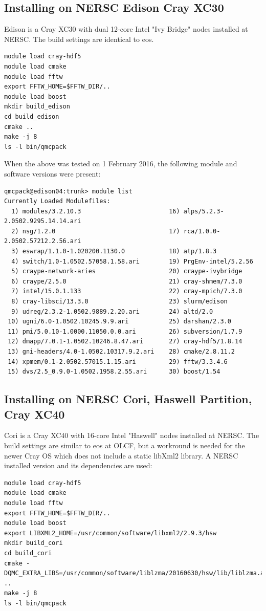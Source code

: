 \subsection{Installing on NERSC Edison Cray XC30}

Edison is a Cray XC30 with dual 12-core Intel "Ivy Bridge" nodes
installed at NERSC. The build settings are identical to eos.

\begin{verbatim}
module load cray-hdf5
module load cmake
module load fftw
export FFTW_HOME=$FFTW_DIR/..
module load boost
mkdir build_edison
cd build_edison
cmake ..
make -j 8
ls -l bin/qmcpack
\end{verbatim}
When the above was tested on 1 February 2016, the following module and
software versions were present:
\begin{verbatim}
qmcpack@edison04:trunk> module list
Currently Loaded Modulefiles:
  1) modules/3.2.10.3                        16) alps/5.2.3-2.0502.9295.14.14.ari
  2) nsg/1.2.0                               17) rca/1.0.0-2.0502.57212.2.56.ari
  3) eswrap/1.1.0-1.020200.1130.0            18) atp/1.8.3
  4) switch/1.0-1.0502.57058.1.58.ari        19) PrgEnv-intel/5.2.56
  5) craype-network-aries                    20) craype-ivybridge
  6) craype/2.5.0                            21) cray-shmem/7.3.0
  7) intel/15.0.1.133                        22) cray-mpich/7.3.0
  8) cray-libsci/13.3.0                      23) slurm/edison
  9) udreg/2.3.2-1.0502.9889.2.20.ari        24) altd/2.0
 10) ugni/6.0-1.0502.10245.9.9.ari           25) darshan/2.3.0
 11) pmi/5.0.10-1.0000.11050.0.0.ari         26) subversion/1.7.9
 12) dmapp/7.0.1-1.0502.10246.8.47.ari       27) cray-hdf5/1.8.14
 13) gni-headers/4.0-1.0502.10317.9.2.ari    28) cmake/2.8.11.2
 14) xpmem/0.1-2.0502.57015.1.15.ari         29) fftw/3.3.4.6
 15) dvs/2.5_0.9.0-1.0502.1958.2.55.ari      30) boost/1.54
\end{verbatim}

\subsection{Installing on NERSC Cori, Haswell Partition, Cray XC40}
Cori is a Cray XC40 with 16-core Intel "Haswell" nodes
installed at NERSC. The build settings are similar to eos at OLCF, but
a workround is needed for the newer Cray OS which does not include a static
libXml2 library. A NERSC installed version and its dependencies are used:

\begin{verbatim}
module load cray-hdf5
module load cmake
module load fftw
export FFTW_HOME=$FFTW_DIR/..
module load boost
export LIBXML2_HOME=/usr/common/software/libxml2/2.9.3/hsw
mkdir build_cori
cd build_cori
cmake -DQMC_EXTRA_LIBS=/usr/common/software/liblzma/20160630/hsw/lib/liblzma.a ..
make -j 8
ls -l bin/qmcpack
\end{verbatim}

